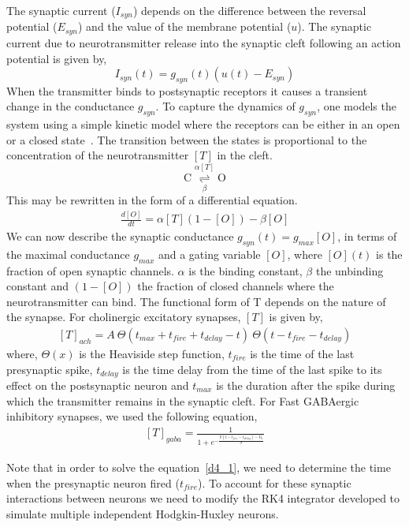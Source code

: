 \documentclass[10pt,letterpaper]{article}
\begin{document}
The synaptic current ($I_{syn}$) depends on the difference between the reversal potential ($E_{syn}$) and the value of the membrane potential ($u$). The synaptic current due to neurotransmitter release into the synaptic cleft following an action potential is given by,
\begin{equation}
I_{syn}(t)=g_{syn}(t)(u(t)−E_{syn})
\label{eq:syncurr}
\end{equation}
When the transmitter binds to postsynaptic receptors it causes a transient change in the conductance $g_{syn}$. To capture the dynamics of $g_{syn}$, one models the system using a simple kinetic model where the receptors can be either in an open or a closed state~\cite{Destexhe1994}. The transition between the states is proportional to the concentration of the neurotransmitter $[T]$ in the cleft. 
\begin{equation}
\mathrm{C}\underset{\beta}{\stackrel{\alpha[T]}{\rightleftharpoons}} \mathrm{O}
\end{equation}
This may be rewritten in the form of a differential equation.
\begin{eqnarray}\label{d4_1}\frac{d[O]}{dt}=\alpha[T](1−[O])−\beta[O]\end{eqnarray}
We can now describe the synaptic conductance $g_{syn}(t)=g_{max}[O]$, in terms of the maximal conductance $g_{max}$ and a gating variable $[O]$, where $[O](t)$ is the fraction of open synaptic channels. $\alpha$ is the binding constant, $\beta$ the unbinding constant and $(1−[O])$ the fraction of closed channels where the neurotransmitter can bind. The functional form of T depends on the nature of the synapse.
For cholinergic excitatory synapses, $[T]$ is given by,
\begin{eqnarray}
\label{d4_2}
[T]_{ach} = A\ \Theta(t_{max}+t_{fire}+t_{delay}-t)\ \Theta(t-t_{fire}-t_{delay})
\end{eqnarray}
where, $\Theta (x)$ is the Heaviside step function, $t_{fire}$ is the time of the last presynaptic spike, $t_{delay}$ is the time delay from the time of the last spike to its effect on the postsynaptic neuron and $t_{max}$ is the duration after the spike during which the transmitter remains in the synaptic cleft.
For Fast GABAergic inhibitory synapses, we used the following equation,
\begin{eqnarray}\label{d4_3}[T]_{gaba} = \frac{1}{1+e^{-\frac{V(t-t_{fire}-t_{delay})-V_0}{\sigma}}}\end{eqnarray}

Note that in order to solve the equation~\ref{d4_1}, we need to determine the time when the presynaptic neuron fired ($t_{fire}$). To account for these synaptic interactions between neurons we need to modify the RK4 integrator developed to simulate multiple independent Hodgkin-Huxley neurons. 
\end{document}
